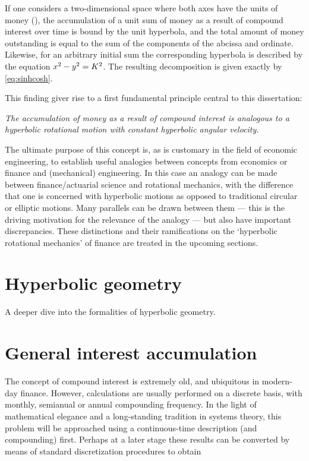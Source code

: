 If one considers a two-dimensional space where both axes have the units of money (\si{\money}), the accumulation of a unit sum of money as a result of compound interest over time is bound by the unit hyperbola, and the total amount of money outstanding is equal to the sum of the components of the abcissa and ordinate. Likewise, for an arbitrary initial sum \ininv the corresponding hyperbola is described by the equation $x^2 - y^2 = K^2$. The resulting decomposition is given exactly by \cref{eq:sinhcosh}.

This finding giver rise to a first fundamental principle central to this dissertation:

\textit{
The accumulation of money as a result of compound interest is analogous to a hyperbolic rotational motion with constant hyperbolic angular velocity.}

The ultimate purpose of this concept is, as is customary in the field of economic engineering, to establish useful analogies between concepts from economics or finance and (mechanical) engineering. In this case an analogy can be made between finance/actuarial science and rotational mechanics, with the difference that one is concerned with hyperbolic motions as opposed to traditional circular or elliptic motions. Many parallels can be drawn between them --- this is the driving motivation for the relevance of the analogy --- but also have important discrepancies. These distinctions and their ramifications on the `hyperbolic rotational mechanics' of finance are treated in the upcoming sections.

\section{Hyperbolic geometry}
A deeper dive into the formalities of hyperbolic geometry.

\section{General interest accumulation}
The concept of compound interest is extremely old, and ubiquitous in modern-day finance. However, calculations are usually performed on a discrete basis, with monthly, semianual or annual compounding frequency. In the light of mathematical elegance and a long-standing tradition in systems theory, this problem will be approached using a continuous-time description (and compounding) first. Perhaps at a later stage these results can be converted by means of standard discretization procedures to obtain 

